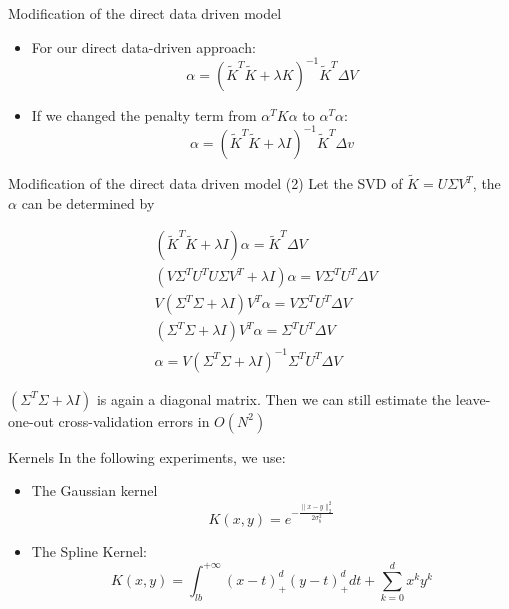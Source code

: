 \documentclass[10pt,table,mathserif]{beamer}
\begin{document}
\begin{frame}{Modification of the direct data driven model }
\begin{itemize}
  \item For our direct data-driven approach:
  \[
  \alpha = (\widetilde{K}^T\widetilde{K}  + \lambda K)^{-1} \widetilde{K}^T \Delta V
  \]
  \item If we changed the penalty term from  $\alpha^T K \alpha$ to $\alpha^T  \alpha$:
  \[\alpha = (\widetilde{K}^T\widetilde{K}  + \lambda I)^{-1} \widetilde{K}^T \Delta v\]

\end{itemize}

\end{frame}


\begin{frame}{Modification of the direct data driven model (2) }
Let the SVD of $\widetilde{K}= U \Sigma V^T$,  the $\alpha$ can be determined by

\[
\begin{split}
&(\widetilde{K}^T\widetilde{K}  + \lambda I)\alpha = \widetilde{K}^T \Delta V\\
& ( V \Sigma^T U^T U \Sigma V^T + \lambda I) \alpha =V  \Sigma^T U^T \Delta V \\
&V (  \Sigma^T  \Sigma  + \lambda I) V^T \alpha =V  \Sigma^T U^T \Delta V \\
&( \Sigma^T  \Sigma  + \lambda I) V^T \alpha =  \Sigma^T U^T \Delta V \\
&\alpha = V (\Sigma^T  \Sigma  + \lambda I)^{-1} \Sigma^T U^T \Delta V
\end{split}
\]

$(\Sigma^T\Sigma + \lambda I)$ is again a diagonal matrix. Then we can still estimate the leave-one-out cross-validation errors in $O(N^2)$

\end{frame}

\begin{frame}{Kernels}
In the following experiments, we use:
\begin{itemize}
\item The Gaussian kernel
\[
K(x,y)=e^{-\frac{\|x-y\|_2^2}{2 \sigma_b^2}}
\]
\item The Spline Kernel:
\[
K(x,y)=\int_{lb}^{+\infty} (x-t)_+^d (y-t)_+^d dt + \sum_{k=0}^d x^ky^k
\]
\end{itemize}
\end{frame}
\end{document}
